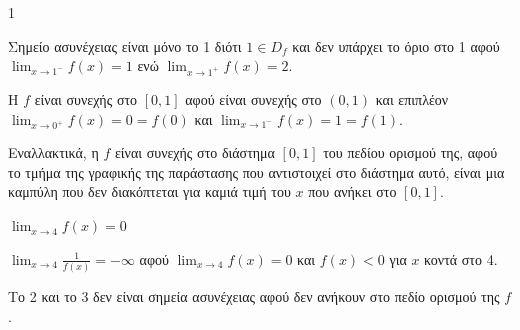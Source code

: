 \begin{ylh}{1}
    \item [Ύλη από εικόνα]
\end{ylh}
\begin{alist}
    \item [α)] Σημείο ασυνέχειας είναι μόνο το 1 διότι $1 \in D_f$ και δεν υπάρχει το όριο στο 1 αφού $\lim_{x \to 1^-} f(x)=1$ ενώ $\lim_{x \to 1^+} f(x)=2$.
    \item [β)] Η $f$ είναι συνεχής στο $[0,1]$ αφού είναι συνεχής στο $(0,1)$ και επιπλέον $\lim_{x \to 0^+} f(x) = 0 = f(0)$ και $\lim_{x \to 1^-} f(x) = 1 = f(1)$.

    Εναλλακτικά, η $f$ είναι συνεχής στο διάστημα $[0,1]$ του πεδίου ορισμού της, αφού το τμήμα της γραφικής της παράστασης που αντιστοιχεί στο διάστημα αυτό, είναι μια καμπύλη που δεν διακόπτεται για καμιά τιμή του $x$ που ανήκει στο $[0,1]$.
    \item [γ)]
    \begin{rlist}
        \item [i.] $\lim_{x \to 4} f(x) = 0$
        \item [iv.] $\lim_{x \to 4} \frac{1}{f(x)} = -\infty$ αφού $\lim_{x \to 4} f(x) = 0$ και $f(x) < 0$ για $x$ κοντά στο 4.
    \end{rlist}
\end{alist}
 Το 2 και το 3 δεν είναι σημεία ασυνέχειας αφού δεν ανήκουν στο πεδίο ορισμού της $f$.